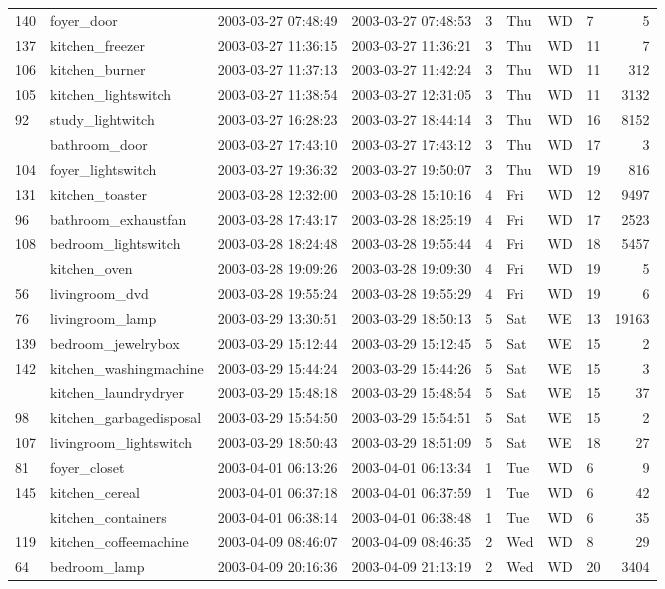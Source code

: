 \documentclass[11pt,]{article}
\begin{document}
\begin{table}[!h]
{\begin{tabular}[t]{llllllllr}
140 & foyer\_door & 2003-03-27 07:48:49 & 2003-03-27 07:48:53 & 3 & Thu & WD & 7 & 5\\
137 & kitchen\_freezer & 2003-03-27 11:36:15 & 2003-03-27 11:36:21 & 3 & Thu & WD & 11 & 7\\
106 & kitchen\_burner & 2003-03-27 11:37:13 & 2003-03-27 11:42:24 & 3 & Thu & WD & 11 & 312\\
105 & kitchen\_lightswitch & 2003-03-27 11:38:54 & 2003-03-27 12:31:05 & 3 & Thu & WD & 11 & 3132\\
92 & study\_lightwitch & 2003-03-27 16:28:23 & 2003-03-27 18:44:14 & 3 & Thu & WD & 16 & 8152\\
\addlinespace
130 & bathroom\_door & 2003-03-27 17:43:10 & 2003-03-27 17:43:12 & 3 & Thu & WD & 17 & 3\\
104 & foyer\_lightswitch & 2003-03-27 19:36:32 & 2003-03-27 19:50:07 & 3 & Thu & WD & 19 & 816\\
131 & kitchen\_toaster & 2003-03-28 12:32:00 & 2003-03-28 15:10:16 & 4 & Fri & WD & 12 & 9497\\
96 & bathroom\_exhaustfan & 2003-03-28 17:43:17 & 2003-03-28 18:25:19 & 4 & Fri & WD & 17 & 2523\\
108 & bedroom\_lightswitch & 2003-03-28 18:24:48 & 2003-03-28 19:55:44 & 4 & Fri & WD & 18 & 5457\\
\addlinespace
129 & kitchen\_oven & 2003-03-28 19:09:26 & 2003-03-28 19:09:30 & 4 & Fri & WD & 19 & 5\\
56 & livingroom\_dvd & 2003-03-28 19:55:24 & 2003-03-28 19:55:29 & 4 & Fri & WD & 19 & 6\\
76 & livingroom\_lamp & 2003-03-29 13:30:51 & 2003-03-29 18:50:13 & 5 & Sat & WE & 13 & 19163\\
139 & bedroom\_jewelrybox & 2003-03-29 15:12:44 & 2003-03-29 15:12:45 & 5 & Sat & WE & 15 & 2\\
142 & kitchen\_washingmachine & 2003-03-29 15:44:24 & 2003-03-29 15:44:26 & 5 & Sat & WE & 15 & 3\\
\addlinespace
90 & kitchen\_laundrydryer & 2003-03-29 15:48:18 & 2003-03-29 15:48:54 & 5 & Sat & WE & 15 & 37\\
98 & kitchen\_garbagedisposal & 2003-03-29 15:54:50 & 2003-03-29 15:54:51 & 5 & Sat & WE & 15 & 2\\
107 & livingroom\_lightswitch & 2003-03-29 18:50:43 & 2003-03-29 18:51:09 & 5 & Sat & WE & 18 & 27\\
81 & foyer\_closet & 2003-04-01 06:13:26 & 2003-04-01 06:13:34 & 1 & Tue & WD & 6 & 9\\
145 & kitchen\_cereal & 2003-04-01 06:37:18 & 2003-04-01 06:37:59 & 1 & Tue & WD & 6 & 42\\
\addlinespace
60 & kitchen\_containers & 2003-04-01 06:38:14 & 2003-04-01 06:38:48 & 1 & Tue & WD & 6 & 35\\
119 & kitchen\_coffeemachine & 2003-04-09 08:46:07 & 2003-04-09 08:46:35 & 2 & Wed & WD & 8 & 29\\
64 & bedroom\_lamp & 2003-04-09 20:16:36 & 2003-04-09 21:13:19 & 2 & Wed & WD & 20 & 3404\\
\bottomrule
\end{tabular}}
\end{table}
\end{document}

